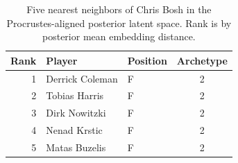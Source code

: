 \begin{table}[htbp]
  \centering\small
  \begin{tabular}{rllc}
    \toprule
    Rank & Player & Position & Archetype \\
    \midrule
    1 & Derrick Coleman & F & 2 \\
    2 & Tobias Harris & F & 2 \\
    3 & Dirk Nowitzki & F & 2 \\
    4 & Nenad Krstic & F & 2 \\
    5 & Matas Buzelis & F & 2 \\
    \bottomrule
  \end{tabular}
  \caption{Five nearest neighbors of Chris Bosh in the Procrustes-aligned posterior latent space. Rank is by posterior mean embedding distance.}
  \label{tab:Chris_Bosh_neighbors}
\end{table}


